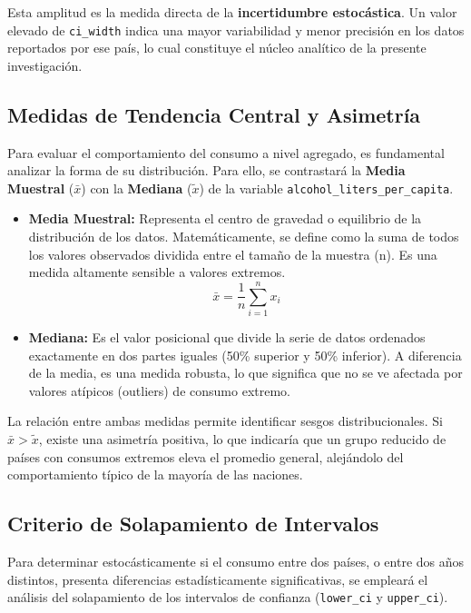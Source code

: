 \documentclass[oneside,11pt]{Latex/Classes/PhDthesisPSnPDF}
\providecommand{\tightlist}{%
  \setlength{\itemsep}{0pt}\setlength{\parskip}{0pt}}
\providecommand{\tightlist}{\setlength{\itemsep}{0pt}\setlength{\parskip}{0pt}}
\begin{document}
Esta amplitud es la medida directa de la
\textbf{incertidumbre estocástica}. Un valor elevado de
\texttt{ci\_width} indica una mayor variabilidad y menor precisión en
los datos reportados por ese país, lo cual constituye el núcleo
analítico de la presente investigación.

\subsection{Medidas de Tendencia Central y Asimetría}

Para evaluar el comportamiento del consumo a nivel agregado, es
fundamental analizar la forma de su distribución. Para ello, se
contrastará la \textbf{Media Muestral} (\(\bar{x}\)) con la
\textbf{Mediana} (\(\tilde{x}\)) de la variable
\texttt{alcohol\_liters\_per\_capita}.

\begin{itemize}
\tightlist
\item
  \textbf{Media Muestral:} Representa el centro de gravedad o equilibrio
  de la distribución de los datos. Matemáticamente, se define como la
  suma de todos los valores observados dividida entre el tamaño de la
  muestra (n). Es una medida altamente sensible a valores extremos.
  \[\bar{x} = \frac{1}{n} \sum_{i=1}^{n} x_i\]
\item
  \textbf{Mediana:} Es el valor posicional que divide la serie de datos
  ordenados exactamente en dos partes iguales (50\% superior y 50\%
  inferior). A diferencia de la media, es una medida robusta, lo que
  significa que no se ve afectada por valores atípicos (outliers) de
  consumo extremo.
\end{itemize}

La relación entre ambas medidas permite identificar sesgos
distribucionales. Si \(\bar{x} > \tilde{x}\), existe una asimetría
positiva, lo que indicaría que un grupo reducido de países con consumos
extremos eleva el promedio general, alejándolo del comportamiento típico
de la mayoría de las naciones.

\subsection{Criterio de Solapamiento de Intervalos}

Para determinar estocásticamente si el consumo entre dos países, o entre
dos años distintos, presenta diferencias estadísticamente
significativas, se empleará el análisis del solapamiento de los
intervalos de confianza (\texttt{lower\_ci} y \texttt{upper\_ci}).
\end{document}

